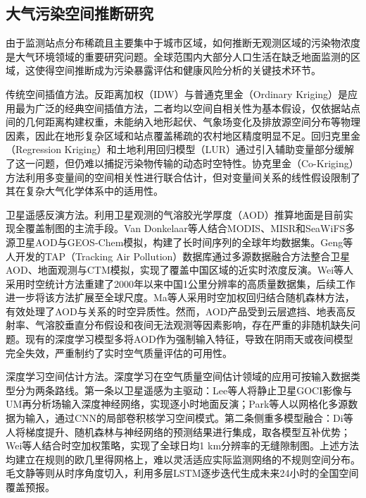 \subsection{大气污染空间推断研究}
\label{subsec:inference_review}

由于监测站点分布稀疏且主要集中于城市区域，如何推断无观测区域的污染物浓度是大气环境领域的重要研究问题。全球范围内大部分人口生活在缺乏地面监测的区域\citep{southerland2022global}，这使得空间推断成为污染暴露评估和健康风险分析的关键技术环节。

传统空间插值方法。反距离加权（IDW）与普通克里金（Ordinary Kriging）是应用最为广泛的经典空间插值方法\citep{li2011review}，二者均以空间自相关性为基本假设，仅依据站点间的几何距离构建权重，未能纳入地形起伏、气象场变化及排放源空间分布等物理因素，因此在地形复杂区域和站点覆盖稀疏的农村地区精度明显不足。回归克里金（Regression Kriging）和土地利用回归模型（LUR）通过引入辅助变量部分缓解了这一问题\citep{hoek2008review}，但仍难以捕捉污染物传输的动态时空特性。协克里金（Co-Kriging）方法利用多变量间的空间相关性进行联合估计，但对变量间关系的线性假设限制了其在复杂大气化学体系中的适用性。

卫星遥感反演方法。利用卫星观测的气溶胶光学厚度（AOD）推算地面\PM{}是目前实现全覆盖制图的主流手段\citep{geng2021tracking,xiao2018ensemble,van2016global}。Van Donkelaar等人\citep{van2016global}结合MODIS、MISR和SeaWiFS多源卫星AOD与GEOS-Chem模拟，构建了长时间序列的全球\PM{}年均数据集。Geng等人开发的TAP（Tracking Air Pollution）数据库\citep{geng2021tracking}通过多源数据融合方法整合卫星AOD、地面观测与CTM模拟，实现了覆盖中国区域的近实时\PM{}浓度反演。Wei等人\citep{wei2021reconstructing}采用时空统计方法重建了2000年以来中国1公里分辨率的高质量\PM{}数据集，后续工作进一步将该方法扩展至全球尺度\citep{wei2023first}。Ma等人\citep{ma2015satellite}采用时空加权回归结合随机森林方法，有效处理了AOD与\PM{}关系的时空异质性。然而，AOD产品受到云层遮挡、地表高反射率、气溶胶垂直分布假设和夜间无法观测等因素影响，存在严重的非随机缺失问题\citep{just2020gradient}。现有的深度学习模型多将AOD作为强制输入特征，导致在阴雨天或夜间模型完全失效，严重制约了实时空气质量评估的可用性。

深度学习空间估计方法。深度学习在空气质量空间估计领域的应用可按输入数据类型分为两条路线。第一条以卫星遥感为主驱动：Lee等人\citep{lee2021hourly}将静止卫星GOCI影像与UM再分析场输入深度神经网络，实现逐小时地面\PM{}反演；Park等人\citep{park2020estimating}以网格化多源数据为输入，通过CNN的局部卷积核学习空间模式。第二条侧重多模型融合：Di等人\citep{di2019ensemble}将梯度提升、随机森林与神经网络的预测结果进行集成，取各模型互补优势；Wei等人\citep{wei2023first}结合时空加权策略，实现了全球日均1 km分辨率的无缝隙\PM{}制图。上述方法均建立在规则的欧几里得网格上，难以灵活适应实际监测网络的不规则空间分布。毛文静等\citep{cn_maowenjing2022lianxu}则从时序角度切入，利用多层LSTM逐步迭代生成未来24小时的全国\PM{}空间覆盖预报。

